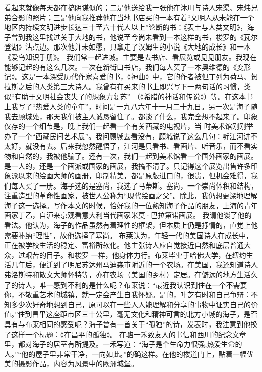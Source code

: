 \documentclass{article}
\begin{document}
\newpage
看起来就像每天都在搞阴谋似的；二是他送给我一张他在沐川与诗人宋渠、宋炜兄弟合影的照片；三是他向我推荐他在当地书店买的一本有着“文明人从未能在一个地区内持续文明进步长达三十至六十代人以上”论断的书：《表土与人类文明》，海子曾到我这里找过关于大地的书，他说至今尚未看到一本这样的书，梭罗的《瓦尔登湖》沾点边。那次他并未如愿，只拿走了汉姆生的小说《大地的成长》和一本《爱鸟知识手册》。
我们常一起进城。主要是去书店、看展览或见见朋友。我现在能够记起的有这么几次。一次在新街口书店，我们每人买了一本奥维德的《变形记》。这是一本深受历代作家喜爱的书，《神曲》中，它的作者被但丁列为荷马、贺拉斯之后的人类第三大诗人。我曾有在买来的书上即兴写下一两句话的习惯，类似“有助于文明社会丧失了的想象力复苏” （《希腊的神话和传说》）等。在这本书上我写了“热爱人类的童年”，时间是一九八六年十一月二十九日。另一次是海子随我去顾城处，那天我们被主人诚恳留住了。都谈了什么，我完全想不起来了。印象仅存的一个细节是，晚上我们一起看一个有关西藏的电视片，当
\newpage
时美术馆刚刚举办了一个“西藏民间艺术展”。我问顾城去看没有，顾城说了这么几句：听江河讲不太好，就没有去。后来我忽然醒悟了，江河是只看书、看画片、听音乐，而不看实物和自然的，我被他骗了。还有一次，我们一起到美术馆看一个国外画家的画展。是一人的，还是一个画派或国家的画展，我搞不清了。只记得这个展览出售许多印象派以来的绘画大师的画册，印制精美，都是原版进口的，很贵，但机会难得，我们每人买了一册。海子选的是塞尚，我选了马蒂斯。塞尚，一个崇尚体积和结构，注重造型的革命性画家，被世人公称为“现代绘画之父”。除此，我仍想更深地理解海子这一选择。写作本文的时候，恰好我的一位熟知海子作品的朋友，上海的青年画家丁乙，自沪来京观看意大利当代画家米莫·巴拉第诺画展。
我请他谈了他的看法。他认为，海子的作品虽然有着理性的框架，但本质上仍是抒情的，直觉上他需要补纳“理性”，故他选择了塞尚。
布莱认为，年轻一代的美国诗人在成长中，正在被学校生活的稳定、富裕所软化。他主张诗人应自觉接近自然和底层普通大众，过艰苦的目子。和梭罗
\newpage
一样，他身体力行。布莱毕业于哈佛大学，在纽约生活几年后，便迁到了明尼苏达州马迪森市附近的一个农场。在美国，我还知道诗人弗洛斯特和散文大师怀特等，亦在农场（美国的乡村）定居。在僻远的地方生活久了的诗人，唯一感到不利的是什么呢？布莱说：“最近我认识到住在一个不需要你，不敬重艺术的城镇，就一定会产生自我怀疑。是的，叶芝有时和自己争辩：不知多少次好奇地想到自己，原可以在一些人人能理解和分享的事物中证实自己的价值。”住到昌平这座距市区三十公里，毫无文化和精神可言的北方小城的海子，是否具有与布莱相同的感受呢？海子曾有一首关于“孤独”的诗，发表时，我注意到他换了这样一个标题：《在昌平的孤独》。
在骆一禾致友人的书信和西川的纪念文章里，都对海子的居室有所提及。一禾写道：“海子是个生命力很强,热爱生命的人。”“他的屋子里非常干净，一向如此。”的确这样。在他的楼道门上，贴着一幅优美的摄影作品，内容为风景中的欧洲城堡。
\end{document}
